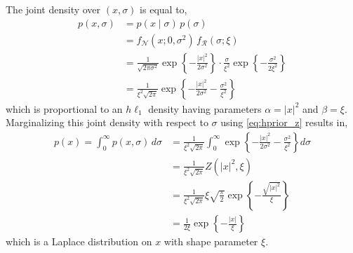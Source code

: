 \documentclass{article}
\begin{document}
The joint density over $(x,\sigma)$ is equal to,
\begin{equation}
\begin{aligned}
p(x, \sigma) &=
 p(x \mid \sigma) \, p(\sigma)
\\ &=
 f_{\mathcal{N}}(x; 0, \sigma^2) \,
 f_{\mathcal{R}}(\sigma; \xi)
\\ &=
 \frac{1}{\sqrt{2 \pi \sigma^2}} \exp\left\{
  -\frac{|x|^2}{2 \sigma^2}
 \right\} \cdot
 \frac{\sigma}{\xi^2} \exp\left\{
  -\frac{\sigma^2}{2 \xi^2}
 \right\}
\\ &=
 \frac{1}{\xi^2 \sqrt{2 \pi}} \exp\left\{
  -\frac{|x|^2}{2 \sigma^2}
  -\frac{\sigma^2}{\xi^2}
 \right\}
\end{aligned}
\label{eq:joint_pdf}
\end{equation}
which is proportional to an $h\ell_1$ density having parameters
$\alpha = |x|^2$ and $\beta = \xi$. Marginalizing this joint density
with respect to $\sigma$ using \eqref{eq:hprior_z} results in,
\begin{equation}
\begin{aligned}
p(x) =
\int_0^\infty p(x, \sigma) \, d\sigma &=
 \frac{1}{\xi^2 \sqrt{2 \pi}} \int_0^\infty \exp\left\{
  -\frac{|x|^2}{2 \sigma^2}
  -\frac{\sigma^2}{\xi^2}
 \right\} d\sigma
\\ &=
 \frac{1}{\xi^2 \sqrt{2 \pi}} Z(|x|^2, \xi)
\\ &=
 \frac{1}{\xi^2 \sqrt{2 \pi}}
 \xi \sqrt{\frac{\pi}{2}}
 \exp\left\{ -\frac{\sqrt{|x|^2}}{\xi} \right\}
\\ &=
 \frac{1}{2 \xi} \exp\left\{ -\frac{|x|}{\xi} \right\}
\end{aligned}
\label{eq:marginal_pdf}
\end{equation}
which is a Laplace distribution on $x$ with shape parameter $\xi$.

\end{document}
